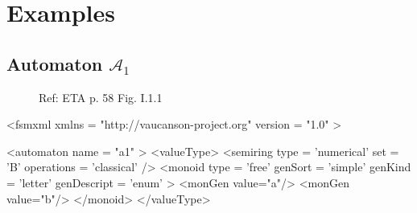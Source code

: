 \section{Examples}

\subsection{Automaton $\mathcal{A}_1$}
\label{automatonA1}

\begin{figure}[h]
  \begin{minipage}[c]{.66\textwidth}
    Ref: ETA p. 58 Fig. I.1.1
  \end{minipage}
  \begin{minipage}[c]{.34\textwidth}

  \end{minipage}
\end{figure}

{\footnotesize
\begin{listing}[5]{1}
<fsmxml  xmlns   = "http://vaucanson-project.org"
         version = "1.0" >

<automaton name = "a1" >
  <valueType>
    <semiring  type        = 'numerical'
               set         = 'B'
               operations  = 'classical' />
    <monoid    type        = 'free'
               genSort     = 'simple'
               genKind     = 'letter'
               genDescript = 'enum' >
      <monGen value="a"/>
      <monGen value="b"/>
    </monoid>
  </valueType>
\end{listing}
}

\newpage

